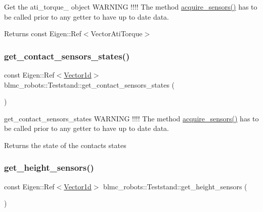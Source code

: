 Get the ati\+\_\+torque\+\_\+ object W\+A\+R\+N\+I\+NG !!!! The method \hyperlink{classblmc__robots_1_1Teststand_a4203e25148ab5b4ddfef3b46647213c6}{acquire\+\_\+sensors()} has to be called prior to any getter to have up to date data. 

\begin{DoxyReturn}{Returns}
const Eigen\+::\+Ref$<$\+Vector\+Ati\+Torque$>$ 
\end{DoxyReturn}
\mbox{\label{classblmc__robots_1_1Teststand_a0486afbd05d4f7c354ebad8432c178bd}} 
\subsubsection{\texorpdfstring{get\+\_\+contact\+\_\+sensors\+\_\+states()}{get\_contact\_sensors\_states()}}
{\footnotesize\ttfamily const Eigen\+::\+Ref$<$\hyperlink{common__header_8hpp_a932c1319d78144ebcaa8938ae070b784}{Vector1d}$>$ blmc\+\_\+robots\+::\+Teststand\+::get\+\_\+contact\+\_\+sensors\+\_\+states (\begin{DoxyParamCaption}{ }\end{DoxyParamCaption})\hspace{0.3cm}{\ttfamily [inline]}}



get\+\_\+contact\+\_\+sensors\+\_\+states W\+A\+R\+N\+I\+NG !!!! The method \hyperlink{classblmc__robots_1_1Teststand_a4203e25148ab5b4ddfef3b46647213c6}{acquire\+\_\+sensors()} has to be called prior to any getter to have up to date data. 

\begin{DoxyReturn}{Returns}
the state of the contacts states 
\end{DoxyReturn}
\mbox{\label{classblmc__robots_1_1Teststand_af8a0d1cc608f91a0a752758c7554087a}} 
\subsubsection{\texorpdfstring{get\+\_\+height\+\_\+sensors()}{get\_height\_sensors()}}
{\footnotesize\ttfamily const Eigen\+::\+Ref$<$\hyperlink{common__header_8hpp_a932c1319d78144ebcaa8938ae070b784}{Vector1d}$>$ blmc\+\_\+robots\+::\+Teststand\+::get\+\_\+height\+\_\+sensors (\begin{DoxyParamCaption}{ }\end{DoxyParamCaption})\hspace{0.3cm}{\ttfamily [inline]}}



